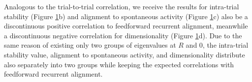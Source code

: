 \documentclass[11pt]{article}
\begin{document}
\begin{figure}[H]
			\label{fig:ttc_its_low_rank_sym_no_noise}
		\end{figure}
	
	Analogous to the trial-to-trial correlation, we receive the results for intra-trial stability (Figure \ref{fig:ttc_its_low_rank_sym_no_noise}b) and alignment to spontaneous activity (Figure \ref{fig:ttc_its_low_rank_sym_no_noise}c) also be a discontinuous positive correlation to feedforward recurrent alignment, meanwhile a discontinuous negative correlation for dimensionality (Figure \ref{fig:ttc_its_low_rank_sym_no_noise}d). Due to the same reason of existing only two groups of eigenvalues at $R$ and $0$, the intra-trial stability value, alignment to spontaneous activity, and dimensionality distribute also separately into two groups while keeping the expected correlations with feedforward recurrent alignment.
	
	
\end{document}
